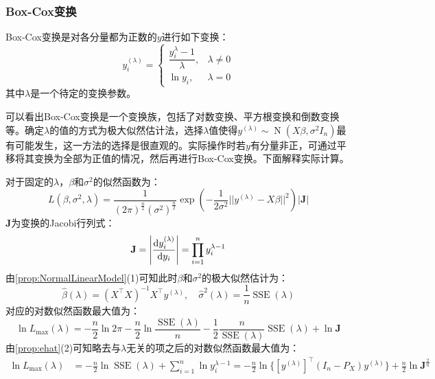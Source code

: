 \subsubsection{Box-Cox变换}
\begin{definition}
	Box-Cox变换是对各分量都为正数的$y$进行如下变换：
	\begin{equation*}
		y_i^{(\lambda)}=
		\begin{cases}
			\dfrac{y_i^{\lambda}-1}{\lambda},&\lambda\ne0 \\
			\ln y_i,&\lambda=0
		\end{cases}
	\end{equation*}
	其中$\lambda$是一个待定的变换参数。
\end{definition}
\begin{note}
	可以看出Box-Cox变换是一个变换族，包括了对数变换、平方根变换和倒数变换等。确定$\lambda$的值的方式为极大似然估计法，选择$\lambda$值使得$y^{(\lambda)}\sim\operatorname{N}(X\beta,\sigma^2I_n)$最有可能发生，这一方法的选择是很直观的。实际操作时若$y$有分量非正，可通过平移将其变换为全部为正值的情况，然后再进行Box-Cox变换。下面解释实际计算。\par
	对于固定的$\lambda$，$\beta$和$\sigma^2$的似然函数为：
	\begin{equation*}
		L(\beta,\sigma^2,\lambda)=\frac{1}{(2\pi)^{\frac{n}{2}}(\sigma^2)^\frac{n}{2}}\exp\left(-\frac{1}{2\sigma^2}||y^{(\lambda)}-X\beta||^2\right)|\mathbf{J}|
	\end{equation*}
	$\mathbf{J}$为变换的Jacobi行列式：
	\begin{equation*}
		\mathbf{J}=\left|\frac{\mathop{}\!\mathrm{d} y_i^{(\lambda)}}{\mathop{}\!\mathrm{d} y_i}\right|=\prod_{i=1}^{n}y_i^{\lambda-1}
	\end{equation*}
	由\cref{prop:NormalLinearModel}(1)可知此时$\beta$和$\sigma^2$的极大似然估计为：
	\begin{equation*}
		\hat{\beta}(\lambda)=(X^{\top}X)^{-1}X^{\top}y^{(\lambda)},\quad\hat{\sigma}^2(\lambda)=\frac{1}{n}\operatorname{SSE}(\lambda)
	\end{equation*}
	对应的对数似然函数最大值为：
	\begin{equation*}
		\ln L_{\text{max}}(\lambda)=-\frac{n}{2}\ln2\pi-\frac{n}{2}\ln\frac{\operatorname{SSE}(\lambda)}{n}-\frac{1}{2}\frac{n}{\operatorname{SSE}(\lambda)}\operatorname{SSE}(\lambda)+\ln\mathbf{J}
	\end{equation*}
	由\cref{prop:ehat}(2)可知略去与$\lambda$无关的项之后的对数似然函数最大值为：
	\begin{align*}
		\ln L_{\text{max}}(\lambda)&=-\frac{n}{2}\ln \operatorname{SSE}(\lambda)+\sum_{i=1}^{n}\ln y_i^{\lambda-1}=-\frac{n}{2}\ln\{[y^{(\lambda)}]^{\top}(I_n-P_X)y^{(\lambda)}\}+\frac{n}{2}\ln\mathbf{J}^{\frac{2}{n}} \\

\end{align*}
\end{note}

